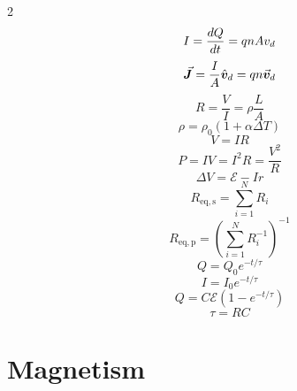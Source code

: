 \begin{multicols*}{2}
\begin{equation*}
    I = \frac{d Q}{d t} = q n A v_d
\end{equation*}
\begin{equation*}
    \vec{\bm{J}} = \frac{I}{A}\hat{\bm{v}}_d = q n  \vec{\bm{v}}_d
\end{equation*}
\begin{equation*}
    R = \frac{V}{I} = \rho \frac{L}{A}
\end{equation*}
\begin{equation*}
    \rho = \rho_0 \left(1 + \alpha \Delta T\right)
\end{equation*}
\begin{equation*}
    V = IR
\end{equation*}
\begin{equation*}
    P = IV = I^2 R = \frac{V^2}{R}
\end{equation*}
\begin{equation*}
    \Delta V = \mathcal{E} - Ir
\end{equation*}
\begin{equation*}
    R_\mathrm{eq,s} = \sum_{i=1}^N R_i
\end{equation*}
\begin{equation*}
    R_\mathrm{eq,p} = \left( \sum_{i=1}^N R_i^{-1} \right)^{-1}
\end{equation*}
\begin{equation*}
    Q = Q_0 e^{-t/\tau}
\end{equation*}
\begin{equation*}
    I = I_0 e^{-t/\tau}
\end{equation*}
\begin{equation*}
    Q = C \mathcal{E} \left( 1 - e^{-t/\tau} \right)
\end{equation*}
\begin{equation*}
    \tau = RC
\end{equation*}

\section{Magnetism}


\end{multicols*}
